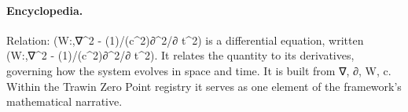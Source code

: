 \paragraph{Encyclopedia.}
Relation: (W:,∇\textasciicircum{}2 - (1)/(c\textasciicircum{}2)∂\textasciicircum{}2/∂ t\textasciicircum{}2) is a differential equation, written (W:,∇\textasciicircum{}2 - (1)/(c\textasciicircum{}2)∂\textasciicircum{}2/∂ t\textasciicircum{}2). It relates the quantity to its derivatives, governing how the system evolves in space and time. It is built from ∇, ∂, W, c. Within the Trawin Zero Point registry it serves as one element of the framework's mathematical narrative.
